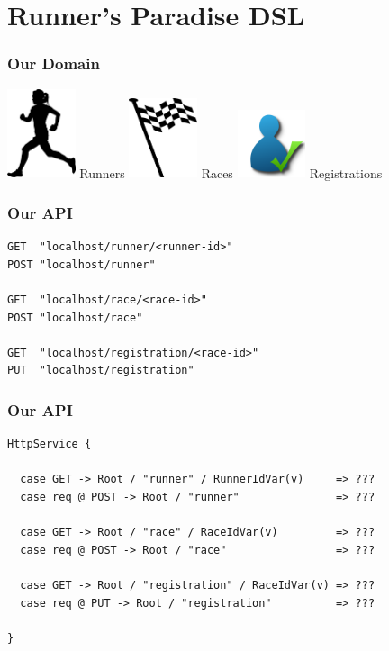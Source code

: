 \documentclass{beamer}
\begin{document}
\section{Runner's Paradise DSL}

\begin{frame}
  \frametitle{Our Domain}
  \begin{center}
    \huge
    \includegraphics[width=2cm]{../pics/runner.png}
    Runners
    \includegraphics[width=2cm]{../pics/race.png}
    Races
    \includegraphics[width=2cm]{../pics/registration.png}
    Registrations
  \end{center}
\end{frame}

\begin{frame}[fragile]
  \frametitle{Our API}
\begin{verbatim}
GET  "localhost/runner/<runner-id>"
POST "localhost/runner"

GET  "localhost/race/<race-id>"
POST "localhost/race"

GET  "localhost/registration/<race-id>"
PUT  "localhost/registration"
\end{verbatim}
\end{frame}

\begin{frame}[fragile]
  \frametitle{Our API}
\begin{verbatim}
HttpService {

  case GET -> Root / "runner" / RunnerIdVar(v)     => ???
  case req @ POST -> Root / "runner"               => ???

  case GET -> Root / "race" / RaceIdVar(v)         => ???
  case req @ POST -> Root / "race"                 => ???

  case GET -> Root / "registration" / RaceIdVar(v) => ???
  case req @ PUT -> Root / "registration"          => ???

}
\end{verbatim}
\end{frame}
\end{document}
